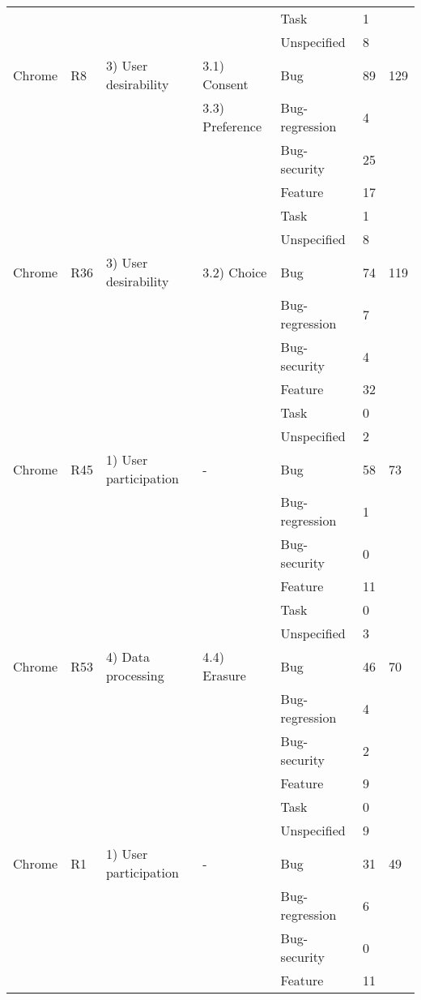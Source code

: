 \documentclass{article}
\begin{document}
\begin{table}[ht]
{\begin{tabular}{|l|l|l|l|l|l|l|}
		~ & ~ & ~ & ~ & Task & 1 & ~ \\ 
		~ & ~ & ~ & ~ & Unspecified & 8 & ~ \\ \hline
		Chrome & R8 & 3) User desirability & 3.1) Consent & Bug & 89 & 129 \\ 
		~ & ~ & ~ & 3.3) Preference & Bug-regression & 4 & ~ \\ 
		~ & ~ & ~ & ~ & Bug-security & 25 & ~ \\ 
		~ & ~ & ~ & ~ & Feature & 17 & ~ \\ 
		~ & ~ & ~ & ~ & Task & 1 & ~ \\ 
		~ & ~ & ~ & ~ & Unspecified & 8 & ~ \\ \hline
		Chrome & R36 & 3) User desirability & 3.2) Choice & Bug & 74 & 119 \\ 
		~ & ~ & ~ & ~ & Bug-regression & 7 & ~ \\ 
		~ & ~ & ~ & ~ & Bug-security & 4 & ~ \\ 
		~ & ~ & ~ & ~ & Feature & 32 & ~ \\ 
		~ & ~ & ~ & ~ & Task & 0 & ~ \\ 
		~ & ~ & ~ & ~ & Unspecified & 2 & ~ \\ \hline
		Chrome & R45 & 1) User participation & - & Bug & 58 & 73 \\ 
		~ & ~ & ~ & ~ & Bug-regression & 1 & ~ \\ 
		~ & ~ & ~ & ~ & Bug-security & 0 & ~ \\ 
		~ & ~ & ~ & ~ & Feature & 11 & ~ \\ 
		~ & ~ & ~ & ~ & Task & 0 & ~ \\ 
		~ & ~ & ~ & ~ & Unspecified & 3 & ~ \\ \hline
		Chrome & R53 & 4) Data processing & 4.4) Erasure & Bug & 46 & 70 \\ 
		~ & ~ & ~ & ~ & Bug-regression & 4 & ~ \\ 
		~ & ~ & ~ & ~ & Bug-security & 2 & ~ \\ 
		~ & ~ & ~ & ~ & Feature & 9 & ~ \\ 
		~ & ~ & ~ & ~ & Task & 0 & ~ \\ 
		~ & ~ & ~ & ~ & Unspecified & 9 & ~ \\ \hline
		Chrome & R1 & 1) User participation & - & Bug & 31 & 49 \\ 
		~ & ~ & ~ & ~ & Bug-regression & 6 & ~ \\ 
		~ & ~ & ~ & ~ & Bug-security & 0 & ~ \\ 
		~ & ~ & ~ & ~ & Feature & 11 & ~ \\ 

\end{tabular}}
\end{table}
\end{document}
